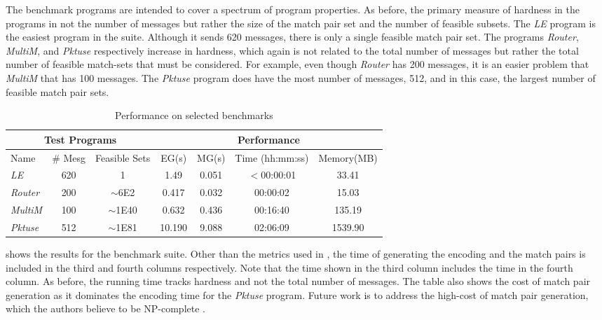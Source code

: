 The benchmark programs are intended to cover a spectrum of program
properties. As before, the primary measure of hardness in the programs
in not the number of messages but rather the size of the match pair
set and the number of feasible subsets.  The \textit{LE} program is
the easiest program in the suite. Although it sends 620 messages,
there is only a single feasible match pair set. The programs
\textit{Router}, \textit{MultiM}, and \textit{Pktuse} respectively
increase in hardness, which again is not related to the total number
of messages but rather the total number of feasible match-sets that
must be considered. For example, even though \textit{Router} has 200
messages, it is an easier problem that \textit{MultiM} that has 100
messages. The \textit{Pktuse} program does have the most number of
messages, 512, and in this case, the largest number of feasible
match pair sets.

\begin{table}[h]
\begin{center}
\setlength{\tabcolsep}{2pt}
\scriptsize
\caption{Performance on selected benchmarks \label{table:second}}
\begin{tabular}{|l|c|c|c|c|c|c|}
		\hline
         \multicolumn{3}{|c|}{Test Programs} & \multicolumn{4}{|c|}{Performance} \\ \hline
         Name & \# Mesg & Feasible Sets & EG(s) & MG(s) & Time (hh:mm:ss) & Memory(MB) \\ \hline
         \textit{LE} & 620 & 1 & 1.49 & 0.051 & $<$00:00:01 & 33.41  \\ %
         \textit{Router} & 200 & $\sim$6E2 & 0.417 & 0.032 & 00:00:02 & 15.03  \\ %
         \textit{MultiM} & 100 & $\sim$1E40 & 0.632 & 0.436 &  00:16:40 & 135.19  \\ %
         \textit{Pktuse} & 512 & $\sim$1E81 & 10.190 & 9.088 & 02:06:09 & 1539.90 \\ %
         \hline
		\end{tabular}
\end{center}
\end{table}

 shows the results for the benchmark
suite. Other than the metrics used in , the time
of generating the encoding and the match pairs is included in the
third and fourth columns respectively. Note that the time shown in the
third column includes the time in the fourth column. As before, the
running time tracks hardness and not the total number of messages. The
table also shows the cost of match pair generation as it dominates the
encoding time for the \textit{Pktuse} program. Future work is to
address the high-cost of match pair generation, which the authors
believe to be NP-complete \cite{match-pair-np-complete}.

